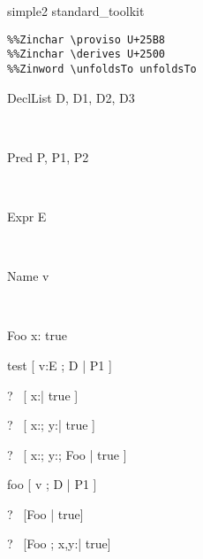 \begin{zsection}
\SECTION simple2 \parents standard\_toolkit
\end{zsection}

\begin{verbatim}
%%Zinchar \proviso U+25B8
%%Zinchar \derives U+2500
%%Zinword \unfoldsTo unfoldsTo
\end{verbatim}
\newcommand{\unfoldsTo}{\mathrel{\leadsto}}

\begin{zedjoker}{DeclList} D, D1, D2, D3\end{zedjoker} \\
\begin{zedjoker}{Pred} P, P1, P2\end{zedjoker} \\
\begin{zedjoker}{Expr} E\end{zedjoker} \\
\begin{zedjoker}{Name} v\end{zedjoker} \\

\begin{schema}{Foo}
  x:\nat
\where
  true
\end{schema}

\begin{zedrule}{test}
  [ v:E ; D | P1 ]
\end{zedrule}

\begin{zed}
  \vdash?~ [ x:\nat | true ]
\end{zed}

\begin{zed}
  \vdash?~ [ x:\nat; y:\nat | true ]
\end{zed}

\begin{zed}
  \vdash?~ [ x:\nat; y:\nat ; Foo | true ]
\end{zed}


\begin{zedrule}{foo}
  [ v ; D | P1 ]
\end{zedrule}

\begin{zed}
  \vdash?~ [Foo | true]
\end{zed}

\begin{zed}
  \vdash?~ [Foo ; x,y:\nat | true]
\end{zed}

